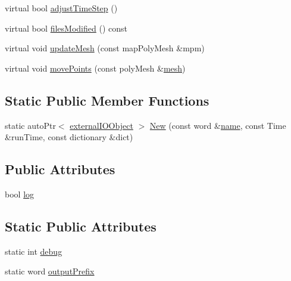 \begin{DoxyCompactItemize}
\item 
virtual bool \hyperlink{classFoam_1_1externalIOObject_1_1externalIOObject_a8a88aad980720a56ff0ff3254f885bf9}{adjust\+Time\+Step} ()
\item 
virtual bool \hyperlink{classFoam_1_1externalIOObject_1_1externalIOObject_a5f4d7c9d8b31ace78d9b759d521dc160}{files\+Modified} () const
\item 
virtual void \hyperlink{classFoam_1_1externalIOObject_1_1externalIOObject_a9c8cde0b192708d622d874f8cc2df66d}{update\+Mesh} (const map\+Poly\+Mesh \&mpm)
\item 
virtual void \hyperlink{classFoam_1_1externalIOObject_1_1externalIOObject_a66fa500d6452898eb1bb9342e534f6aa}{move\+Points} (const poly\+Mesh \&\hyperlink{createMeshesPostProcess_8H_a8bb1e58291d2d2b653e024a4f4bffe38}{mesh})
\end{DoxyCompactItemize}
\subsection*{Static Public Member Functions}
\begin{DoxyCompactItemize}
\item 
static auto\+Ptr$<$ \hyperlink{classFoam_1_1externalIOObject_1_1externalIOObject}{external\+I\+O\+Object} $>$ \hyperlink{classFoam_1_1externalIOObject_1_1externalIOObject_a24743919db93314770318639f3bea937}{New} (const word \&\hyperlink{classFoam_1_1externalIOObject_1_1externalIOObject_ade4113569ef0db70665fded275a5e38e}{name}, const Time \&run\+Time, const dictionary \&dict)
\end{DoxyCompactItemize}
\subsection*{Public Attributes}
\begin{DoxyCompactItemize}
\item 
bool \hyperlink{classFoam_1_1externalIOObject_1_1externalIOObject_ae81d3246bfc238875eaecb9aff755a2e}{log}
\end{DoxyCompactItemize}
\subsection*{Static Public Attributes}
\begin{DoxyCompactItemize}
\item 
static int \hyperlink{classFoam_1_1externalIOObject_1_1externalIOObject_ac3e1795766a80ec63b157951b4b9a7d4}{debug}
\item 
static word \hyperlink{classFoam_1_1externalIOObject_1_1externalIOObject_a10f9cf16844cb1df49120a672a6a731a}{output\+Prefix}
\end{DoxyCompactItemize}
